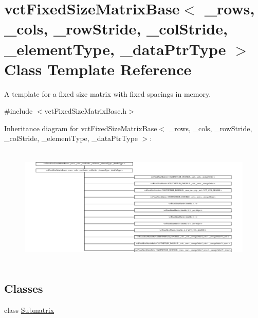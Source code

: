 \hypertarget{classvct_fixed_size_matrix_base}{}\section{vct\+Fixed\+Size\+Matrix\+Base$<$ \+\_\+rows, \+\_\+cols, \+\_\+row\+Stride, \+\_\+col\+Stride, \+\_\+element\+Type, \+\_\+data\+Ptr\+Type $>$ Class Template Reference}
\label{classvct_fixed_size_matrix_base}


A template for a fixed size matrix with fixed spacings in memory.  




{\ttfamily \#include $<$vct\+Fixed\+Size\+Matrix\+Base.\+h$>$}

Inheritance diagram for vct\+Fixed\+Size\+Matrix\+Base$<$ \+\_\+rows, \+\_\+cols, \+\_\+row\+Stride, \+\_\+col\+Stride, \+\_\+element\+Type, \+\_\+data\+Ptr\+Type $>$\+:\begin{figure}[H]
\begin{center}
\leavevmode
\includegraphics[height=5.798817cm]{d5/dad/classvct_fixed_size_matrix_base}
\end{center}
\end{figure}
\subsection*{Classes}
\begin{DoxyCompactItemize}
\item 
class \hyperlink{classvct_fixed_size_matrix_base_1_1_submatrix}{Submatrix}
\end{DoxyCompactItemize}
